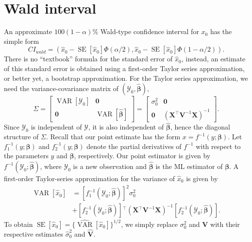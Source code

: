 \documentclass{article}\usepackage[]{graphicx}\usepackage[]{color}
\newcommand{\trans}{\ensuremath{^\top}}
\newcommand{\VAR}{\operatorname{VAR}}
\newcommand{\SE}{\operatorname{SE}}
\begin{document}

\section{Wald interval}\label{sec:wald}

An approximate $100(1-\alpha)\%$ Wald-type confidence interval for $x_0$ has the simple form
\begin{equation}
\label{eqn:wald}
  CI_{wald} = \left( \widehat{x}_0 -  \SE\left[\widehat{x}_0\right]\Phi\left(\alpha/2\right),  \widehat{x}_0 -  \SE\left[\widehat{x}_0\right]\Phi\left(1-\alpha/2\right) \right).
\end{equation}
There is no ``textbook'' formula for the standard error of $\widehat{x}_0$, instead, an estimate of this standard error is obtained using a first-order Taylor series approximation, or better yet, a bootstrap approximation.  For the Taylor series approximation, we need the variance-covariance matrix of $\left(\mathcal{Y}_0, \widehat{\bm{\beta}}\right)$,
\[
\Sigma = \begin{bmatrix}
           \VAR\left[\mathcal{Y}_0\right] & \bm{0} \\
           \bm{0} & \VAR\left[\widehat{\bm{\beta}}\right]
         \end{bmatrix} = \begin{bmatrix}
           \sigma_0^2 & \bm{0} \\
           \bm{0} & \left(\bm{X}\trans\bm{V}^{-1}\bm{X}\right)^{-1}
         \end{bmatrix}.
\]
Since $\mathcal{Y}_0$ is independent of $\bm{\mathcal{Y}}$, it is also independent of $\widehat{\bm{\beta}}$, hence the diagonal structure of $\Sigma$. Recall that our point estimate has the form $x = f^{-1}\left(y; \bm{\beta}\right)$. Let $f_1^{-1}\left(y; \bm{\beta}\right)$ and $f_2^{-1}\left(y; \bm{\beta}\right)$ denote the partial derivatives of $f^{-1}$ with respect to the parameters $y$ and $\bm{\beta}$, respectively. Our point estimator is given by $f^{-1}\left(\mathcal{Y}_0; \widehat{\bm{\beta}}\right)$, where $\mathcal{Y}_0$ is a new observation and $\widehat{\bm{\beta}}$ is the ML estimator of $\bm{\beta}$.  A first-order Taylor-series approximation for the variance of $\widehat{x}_0$ is given by
\begin{align}
  \VAR\left[\widehat{x}_0\right] &= \left[f_1^{-1}\left(\mathcal{Y}_0; \widehat{\bm{\beta}}\right)\right]^2\sigma_0^2 \nonumber \\
   &+ \left[f_2^{-1}\left(\mathcal{Y}_0; \widehat{\bm{\beta}}\right)\right]\trans\left(\bm{X}\trans\bm{V}^{-1}\bm{X}\right)^{-1}\left[f_2^{-1}\left(\mathcal{Y}_0; \widehat{\bm{\beta}}\right)\right].
\end{align}
To obtain $\SE\left[\widehat{x}_0\right] = \Big\{ \widehat{\VAR}\left[\widehat{x}_0\right] \Big\}^{1/2}$, we simply replace $\sigma_0^2$ and $\bm{V}$ with their respective estimates $\widehat{\sigma}_0^2$ and $\widehat{\bm{V}}$.
\end{document}
